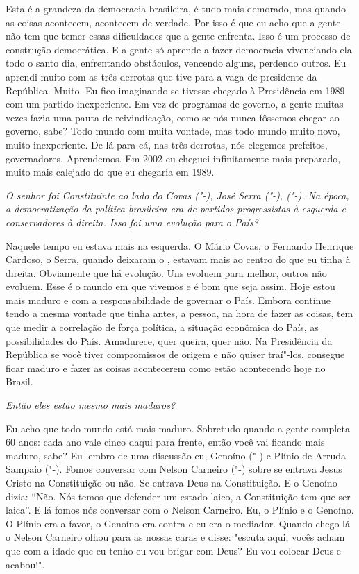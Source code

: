 Esta é a grandeza da democracia brasileira, é tudo mais demorado, mas
quando as coisas acontecem, acontecem de verdade. Por isso é que eu acho
que a gente não tem que temer essas dificuldades que a gente enfrenta.
Isso é um processo de construção democrática. E a gente só aprende a
fazer democracia vivenciando ela todo o santo dia, enfrentando
obstáculos, vencendo alguns, perdendo outros. Eu aprendi muito com as
três derrotas que tive para a vaga de presidente da República. Muito. Eu
fico imaginando se tivesse chegado à Presidência em 1989 com um partido
inexperiente. Em vez de programas de governo, a gente muitas vezes fazia
uma pauta de reivindicação, como se nós nunca fôssemos chegar ao
governo, sabe? Todo mundo com muita vontade, mas todo mundo muito novo,
muito inexperiente. De lá para cá, nas três derrotas, nós elegemos
prefeitos, governadores. Aprendemos. Em 2002 eu cheguei infinitamente
mais preparado, muito mais calejado do que eu chegaria em 1989.

\medskip

\noindent\emph{O senhor foi Constituinte ao lado do Covas ("-), José Serra
("-),  ("-). Na época, a democratização da política
brasileira era de partidos progressistas à esquerda e conservadores à
direita. Isso foi uma evolução para o País?}

Naquele tempo eu estava mais na esquerda. O Mário Covas,
o Fernando Henrique Cardoso, o Serra, quando deixaram o , estavam
mais ao centro do que eu tinha à direita. Obviamente que há evolução.
Uns evoluem para melhor, outros não evoluem. Esse é o mundo em que
vivemos e é bom que seja assim. Hoje estou mais maduro e com a
responsabilidade de governar o País. Embora continue tendo a mesma
vontade que tinha antes, a pessoa, na hora de fazer as coisas, tem que
medir a correlação de força política, a situação econômica do País, as
possibilidades do País. Amadurece, quer queira, quer não. Na Presidência
da República se você tiver compromissos de origem e não quiser traí"-los,
consegue ficar maduro e fazer as coisas acontecerem como estão
acontecendo hoje no Brasil.

\medskip

\noindent\emph{Então eles estão mesmo mais maduros?}

Eu acho que todo mundo está mais maduro. Sobretudo quando
a gente completa 60 anos: cada ano vale cinco daqui para frente, então
você vai ficando mais maduro, sabe? Eu lembro de uma discussão eu,
Genoíno ("-) e Plínio de Arruda Sampaio ("-). Fomos conversar com
Nelson Carneiro ("-) sobre se entrava Jesus Cristo na Constituição
ou não. Se entrava Deus na Constituição. E o Genoíno dizia: ``Não. Nós
temos que defender um estado laico, a Constituição tem que ser laica''.
E lá fomos nós conversar com o Nelson Carneiro. Eu, o Plínio e o
Genoíno. O Plínio era a favor, o Genoíno era contra e eu era o mediador.
Quando chego lá o Nelson Carneiro olhou para as nossas caras e disse:
"escuta aqui, vocês acham que com a idade que eu tenho eu vou brigar com
Deus? Eu vou colocar Deus e acabou!".

